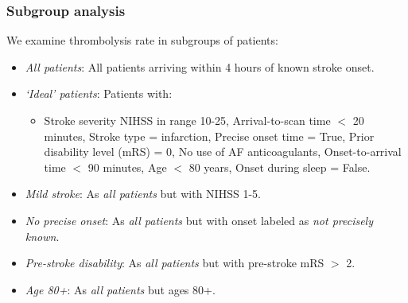 \begin{frame}
\frametitle{Subgroup analysis}

We examine thrombolysis rate in subgroups of patients:

\begin{itemize}
    \item \emph{All patients}: All patients arriving within 4 hours of known stroke onset.
    \item \emph{`Ideal' patients}: Patients with:
    \begin{itemize}
        \item Stroke severity NIHSS in range 10-25, Arrival-to-scan time $<$ 20 minutes, Stroke type = infarction, Precise onset time = True, Prior disability level (mRS) = 0, No use of AF anticoagulants, Onset-to-arrival time $<$ 90 minutes, Age $<$ 80 years, Onset during sleep = False.
    \end{itemize}
    \item \emph{Mild stroke}: As \emph{all patients} but with NIHSS 1-5.
    \item \emph{No precise onset}: As \emph{all patients} but with onset labeled as \emph{not precisely known}.
    \item \emph{Pre-stroke disability}: As \emph{all patients} but with pre-stroke mRS $>$ 2.
    \item \emph{Age 80+}: As \emph{all patients} but ages 80+.
    
\end{itemize}

\end{frame}